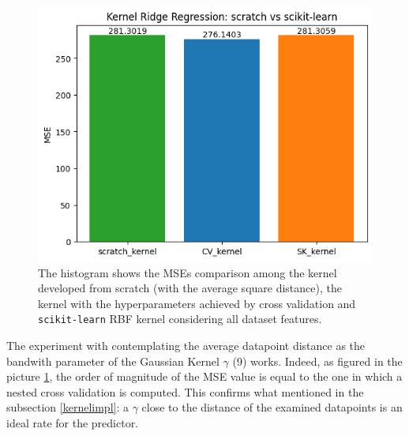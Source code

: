 \documentclass{article}
\begin{document}
\begin{figure}[H]
	\begin{adjustwidth}{0 cm}{}
		\begin{center}
			\includegraphics[scale= 0.53]{images/finalKernel.png}
		\end{center}
	\end{adjustwidth}
	\caption{The histogram shows the MSEs comparison among the kernel developed from scratch (with the average square distance), the kernel with the hyperparameters achieved by cross validation and \texttt{scikit-learn} RBF kernel \cite{rbf} considering all dataset features.}
	\label{KRRcomparison}
\end{figure}

The experiment with contemplating the average datapoint distance as the bandwith parameter of the Gaussian Kernel $\gamma$ (9) works. Indeed, as figured in the picture \ref{KRRcomparison}, the order of magnitude of the MSE value is equal to the one in which a nested cross validation is computed. This confirms what mentioned in the subsection \ref{kernelimpl}: a $\gamma$ close to the distance of the examined datapoints is an ideal rate for the predictor. 

\newpage




\vspace{36pt}

\let\thefootnote\relax{}
\end{document}
